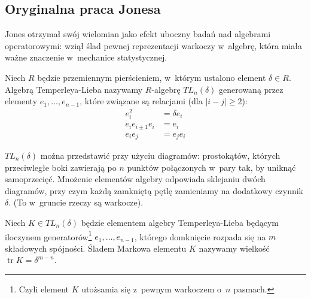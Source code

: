 \subsection{Oryginalna praca Jonesa} %
\label{sub:jones_paper}
Jones otrzymał swój wielomian jako efekt uboczny badań nad algebrami operatorowymi: wziął ślad pewnej reprezentacji warkoczy w~algebrę, która miała ważne znaczenie w~mechanice statystycznej.


\begin{definition}
	Niech $R$ będzie przemiennym pierścieniem, w~którym ustalono element $\delta \in R$.
	Algebrą Temperleya-Lieba nazywamy $R$-algebrę $TL_n(\delta)$ generowaną przez elementy $e_1, \ldots, e_{n-1}$, które związane są relacjami (dla $|i-j| \ge 2$):
	\begin{align*}
		e_i^2 & = \delta e_i \\
		e_i e_{i \pm 1} e_i & = e_i \\
		e_i e_j & = e_j e_i
	\end{align*}
\end{definition}

$TL_n(\delta)$ można przedstawić przy użyciu diagramów: prostokątów, których przeciwległe boki zawierają po $n$ punktów połączonych w~pary tak, by uniknąć samoprzecięć. Mnożenie elementów algebry odpowiada sklejaniu dwóch diagramów, przy czym każdą zamkniętą pętlę zamieniamy na dodatkowy czynnik $\delta$.
(To w~gruncie rzeczy są warkocze).

\begin{definition}
	Niech $K \in TL_n(\delta)$ będzie elementem algebry Temperleya-Lieba będącym iloczynem generatorów\footnote{Czyli element $K$ utożsamia się z~pewnym warkoczem o~$n$ pasmach.} $e_1, \ldots, e_{n-1}$, którego domknięcie rozpada się na $m$ składowych spójności.
	Śladem Markowa elementu $K$ nazywamy wielkość $\operatorname{tr} K = \delta^{m-n}$.
\end{definition}

